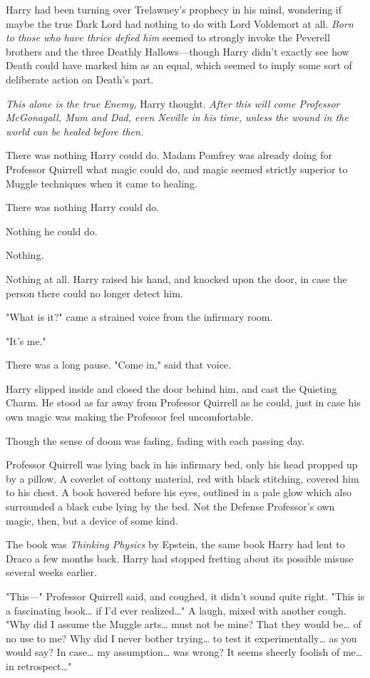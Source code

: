 Harry had been turning over Trelawney's prophecy in his mind, wondering if 
maybe the true Dark Lord had nothing to do with Lord Voldemort at all. 
\emph{Born to those who have thrice defied him} seemed to strongly invoke the 
Peverell brothers and the three Deathly Hallows---though Harry didn't exactly 
see how Death could have marked him as an equal, which seemed to imply some 
sort of deliberate action on Death's part.

\emph{This alone is the true Enemy,} Harry thought. \emph{After this will come 
Professor McGonagall, Mum and Dad, even Neville in his time, unless the wound 
in the world can be healed before then.}

There was nothing Harry could do. Madam Pomfrey was already doing for Professor 
Quirrell what magic could do, and magic seemed strictly superior to Muggle 
techniques when it came to healing.

There was nothing Harry could do.

Nothing he could do.

Nothing.

Nothing at all.
\sbreak
Harry raised his hand, and knocked upon the door, in case the person there 
could no longer detect him.

"What is it?" came a strained voice from the infirmary room.

"It's me."

There was a long pause. "Come in," said that voice.

Harry slipped inside and closed the door behind him, and cast the Quieting 
Charm. He stood as far away from Professor Quirrell as he could, just in case 
his own magic was making the Professor feel uncomfortable.

Though the sense of doom was fading, fading with each passing day.

Professor Quirrell was lying back in his infirmary bed, only his head propped 
up by a pillow. A coverlet of cottony material, red with black stitching, 
covered him to his chest. A book hovered before his eyes, outlined in a pale 
glow which also surrounded a black cube lying by the bed. Not the Defense 
Professor's own magic, then, but a device of some kind.

The book was \emph{Thinking Physics} by Epstein, the same book Harry had lent 
to Draco a few months back. Harry had stopped fretting about its possible 
misuse several weeks earlier.

"This---" Professor Quirrell said, and coughed, it didn't sound quite right. 
"This is a fascinating book{\ldots} if I'd ever realized{\ldots}" A laugh, 
mixed with another cough. "Why did I assume the Muggle arts{\ldots} must not be 
mine? That they would be{\ldots} of no use to me? Why did I never bother 
trying{\ldots} to test it experimentally{\ldots} as you would say? In 
case{\ldots} my assumption{\ldots} was wrong? It seems sheerly foolish of 
me{\ldots} in retrospect{\ldots}"

